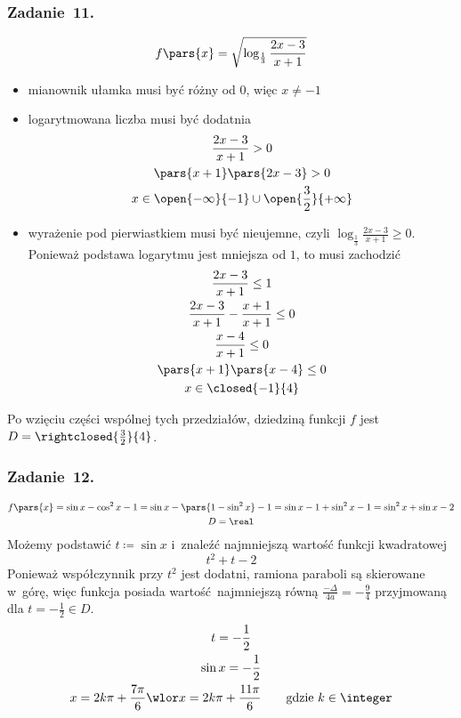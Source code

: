 \subsubsection*{Zadanie~11.}
\begin{equation*}
    f\pars{x} = \sqrt{\log_{\frac{1}{3}} \frac{2x - 3}{x + 1}}
\end{equation*}
\begin{itemize}
    \item mianownik ułamka musi być różny od \(0\), więc \(x \neq -1\)
    \item logarytmowana liczba musi być dodatnia
        \begin{gather*}
            \frac{2x - 3}{x + 1} > 0\\
            \pars{x + 1}\pars{2x - 3} > 0\\
            x \in \open{-\infty}{-1} \cup \open{\frac{3}{2}}{+\infty}
        \end{gather*}
    \item wyrażenie pod pierwiastkiem musi być nieujemne, czyli \(\log_{\frac{1}{3}} \frac{2x - 3}{x + 1} \geq 0\). Ponieważ podstawa logarytmu jest mniejsza od \(1\), to musi zachodzić
        \begin{gather*}
            \frac{2x - 3}{x + 1} \leq 1\\
            \frac{2x - 3}{x + 1} - \frac{x + 1}{x + 1} \leq 0\\
            \frac{x - 4}{x + 1} \leq 0\\
            \pars{x + 1}\pars{x - 4} \leq 0\\
            x \in \closed{-1}{4}
        \end{gather*}
\end{itemize}
Po wzięciu części wspólnej tych przedziałów, dziedziną funkcji \(f\) jest \(D = \rightclosed{\frac{3}{2}}{4}\).
\subsubsection*{Zadanie~12.}
\begin{gather*}
    f\pars{x}
        = \sin x - \cos^2 x - 1
        = \sin x - \pars{1 - \sin^2 x} - 1
        = \sin x - 1 + \sin^2 x - 1
        = \sin^2x + \sin x - 2\\
    D = \real
\end{gather*}
Możemy podstawić \(t \coloneqq \sin x\) i~znaleźć najmniejszą wartość funkcji kwadratowej
\begin{equation*}
    t^2 + t - 2
\end{equation*}
Ponieważ współczynnik przy \(t^2\) jest dodatni, ramiona paraboli są skierowane w~górę, więc funkcja posiada wartość najmniejszą równą \(\frac{-\Delta}{4a} = -\frac{9}{4}\) przyjmowaną dla \(t = -\frac{1}{2} \in D\).
\begin{gather*}
    t = -\frac{1}{2}\\
    \sin x = -\frac{1}{2}\\
    x = 2k\pi + \frac{7\pi}{6} \wlor x = 2k\pi + \frac{11\pi}{6} \qquad \text{gdzie \(k \in \integer\)}
\end{gather*}
